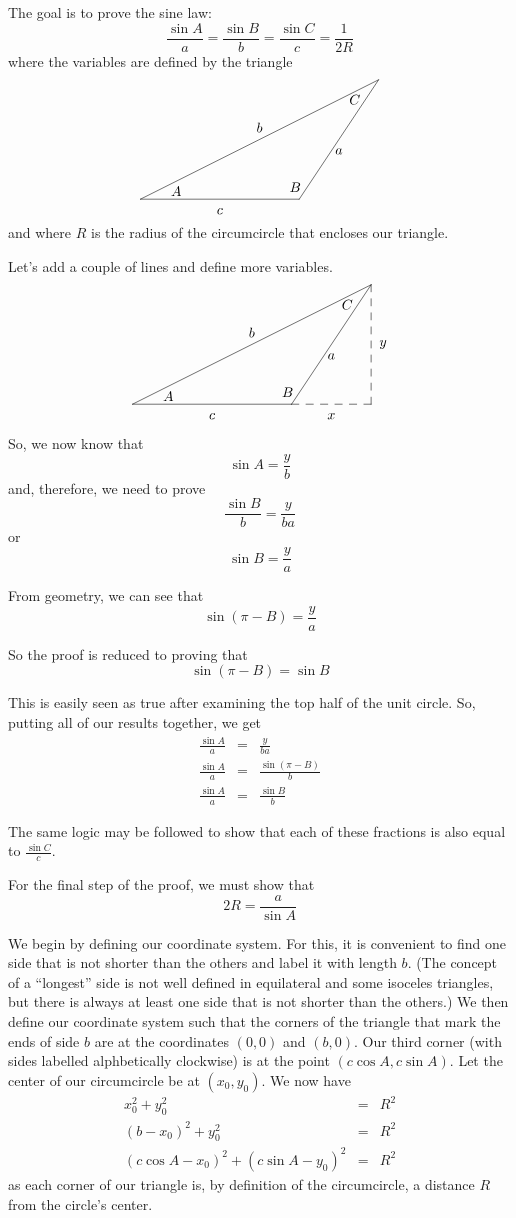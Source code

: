 \documentclass{article}
\begin{document}
The goal is to prove the sine law:
\[
\frac{\sin A}{a} = \frac{\sin B}{b}=\frac{\sin C}{c}=\frac{1}{2R}
\]
where the variables are defined by the triangle
\[
\begin{xy}
,(0,0)
;(40,0)**@{-}
;(60,30)**@{-}
;(0,0)**@{-}
,(50,12)*{a}
,(30,18)*{b}
,(20,-3)*{c}
,(9,2)*{A}
,(39,3)*{B}
,(54,25)*{C}
\end{xy}
\]
and where $R$ is the radius of the circumcircle that encloses our triangle.

Let's add a couple of lines and define more variables.  
\[
\begin{xy}
,(0,0)
;(40,0)**@{-}
;(60,30)**@{-}
;(0,0)**@{-}
,(50,12)*{a}
,(30,18)*{b}
,(20,-3)*{c}
,(9,2)*{A}
,(39,3)*{B}
,(54,25)*{C}
,(40,0)
;(60,0)**@{--}
;(60,30)**@{--}
,(50,-3)*{x}
,(63,15)*{y}
\end{xy}
\]

So, we now know that
\[
\sin A = \frac{y}{b}
\]
and, therefore, we need to prove
\[
\frac{\sin B}{b} = \frac{y}{ba}
\]
or
\[
\sin B = \frac{y}{a}
\]

From geometry, we can see that
\[
\sin\left(\pi-B\right) = \frac{y}{a}
\]

So the proof is reduced to proving that
\[
\sin\left(\pi-B\right) = \sin B
\]

This is easily seen as
true after examining the top half of the unit circle.  So, putting all
of our results together, we get
\begin{eqnarray}
\frac{\sin A}{a} & = & \frac{y}{ba}\nonumber\\
\frac{\sin A}{a} & = &
\frac{\sin\left(\pi-B\right)}{b}\nonumber\\
\frac{\sin A}{a} & = & \frac{\sin B}{b}
\end{eqnarray}

The same logic may be followed to show that each of these fractions is
also equal to $\frac{\sin C}{c}$.

For the final step of the proof, we must show that 
\[
2R = \frac{a}{\sin A}
\]

We begin by defining our coordinate system.  For this, it is
convenient to find one side that is not shorter than the others and
label it with length $b$.  (The concept of a ``longest'' side is not
well defined in equilateral and some isoceles triangles, but there is
always at least one side that is not shorter than the others.)  We
then define our coordinate system such that the corners of the
triangle that mark the ends of side $b$ are at the coordinates
$\left(0,0\right)$ and $\left(b,0\right)$.  Our third corner (with
sides labelled alphbetically clockwise) is at the point $\left(c\cos
  A,c\sin A\right)$.  Let the center of our circumcircle be at
$\left(x_0,y_0\right)$.  We now have 
\begin{eqnarray}
x_0^2 + y_0^2 &=& R^2 \label{pointA}\\
\left(b-x_0\right)^2 + y_0^2 &=& R^2 \label{pointC}\\
\left(c\cos A - x_0\right)^2 + \left(c\sin A-y_0\right)^2 &=& R^2
\label{pointB} 
\end{eqnarray}
as each corner of our triangle is, by definition of the circumcircle,
a distance $R$ from the circle's center.
\end{document}
